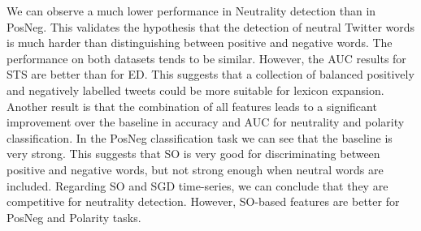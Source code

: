\documentclass{sig-alternate}
\begin{document}
We can observe a much lower performance in Neutrality detection than in PosNeg. This validates the hypothesis that the detection of neutral Twitter words is much harder than distinguishing between positive and negative words.  
The performance on both datasets tends to be similar. However, the AUC results for STS are better than for ED. This suggests that a collection of balanced positively and negatively labelled tweets could be more suitable for lexicon expansion. 
Another result is that the combination of all features leads to a significant improvement over the baseline in accuracy and AUC for neutrality and polarity classification. In the PosNeg classification task we can see that the baseline is very strong. This suggests that SO is very good for discriminating between positive and negative words, but not strong enough when neutral words are included.
Regarding SO and SGD time-series, we can conclude that they are competitive for neutrality detection. However, SO-based features are better for PosNeg and Polarity tasks. 
\end{document}
